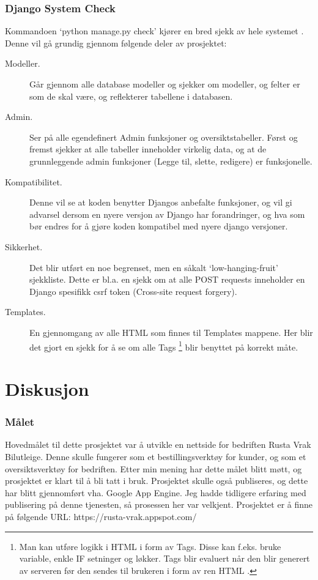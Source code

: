 \subsection{Django System Check}
Kommandoen ‘python manage.py check’ kjører en bred sjekk av hele systemet \citep{tests:django}. Denne vil gå grundig gjennom følgende deler av prosjektet:
\begin{description}
\item[Modeller.]Går gjennom alle database modeller og sjekker om modeller, og felter er som de skal være, og reflekterer tabellene i databasen.
\item[Admin.]Ser på alle egendefinert Admin funksjoner og oversiktstabeller. Først og fremst sjekker at alle tabeller inneholder virkelig data, og at de grunnleggende admin funksjoner (Legge til, slette, redigere) er funksjonelle.
\item[Kompatibilitet.]Denne vil se at koden benytter Djangos anbefalte funksjoner, og vil gi advarsel dersom en nyere versjon av Django har forandringer, og hva som bør endres for å gjøre koden kompatibel med nyere django versjoner.
\item[Sikkerhet.]Det blir utført en noe begrenset, men en såkalt ‘low-hanging-fruit’ sjekkliste. Dette er bl.a. en sjekk om at alle POST requests inneholder en Django spesifikk csrf token (Cross-site request forgery).
\item[Templates.]En gjennomgang av alle HTML som finnes til Templates mappene. Her blir det gjort en sjekk for å se om alle Tags \footnote{Man kan utføre logikk i HTML i form av Tags. Disse kan f.eks. bruke variable, enkle IF setninger og løkker. Tags blir evaluert når den blir generert av serveren før den sendes til brukeren i form av ren HTML \cite{django:tags}.} blir benyttet på korrekt måte.


\end{description}




\chapter{Diskusjon}

%
\subsection*{Målet}
Hovedmålet til dette prosjektet var å utvikle en nettside for bedriften Rusta Vrak Bilutleige. Denne skulle fungerer som et bestillingsverktøy for kunder, og som et oversiktsverktøy for bedriften. Etter min mening har dette målet blitt møtt, og prosjektet er klart til å bli tatt i bruk.
Prosjektet skulle også publiseres, og dette har blitt gjennomført vha. Google App Engine. Jeg hadde tidligere erfaring med publisering på denne tjenesten, så prosessen her var velkjent. Prosjektet er å finne på følgende URL: https://rusta-vrak.appspot.com/ 
